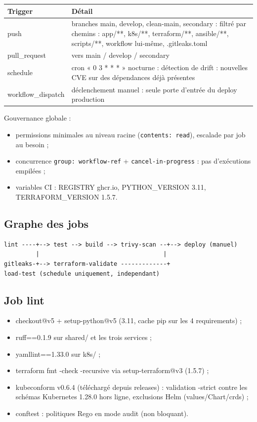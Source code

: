 \documentclass[12pt,a4paper,twoside,openright]{report}
\begin{document}
\begin{center}\label{tab:ch-github-actions-declenchements-et-gouvernance}\end{center}
\begin{longtable}{@{}p{3.4cm}p{10.8cm}@{}}
\toprule
\textbf{Trigger} & \textbf{Détail} \\
\midrule
\endhead
push & branches main, develop, clean-main, secondary : filtré par chemins : app/**, k8s/**, terraform/**, ansible/**, scripts/**, workflow lui-même, .gitleaks.toml \\
pull\_request & vers main / develop / secondary \\
schedule & cron « 0 3 * * * » nocturne : détection de drift : nouvelles CVE sur des dépendances déjà présentes \\
workflow\_dispatch & déclenchement manuel : seule porte d'entrée du deploy production \\
\bottomrule
\end{longtable}

Gouvernance globale :
\begin{itemize}[itemsep=1pt]
  \item permissions minimales au niveau racine (\texttt{contents: read}), escalade par job au besoin ;
  \item concurrence \texttt{group: workflow-ref} + \texttt{cancel-in-progress} : pas d'exécutions empilées ;
  \item variables CI : REGISTRY ghcr.io, PYTHON\_VERSION 3.11, TERRAFORM\_VERSION 1.5.7.
\end{itemize}

\subsection{Graphe des jobs}
\begin{lstlisting}[caption={Ordre et dépendances des jobs}]
lint ----+--> test --> build --> trivy-scan --+--> deploy (manuel)
         |                                   |
gitleaks-+--> terraform-validate -------------+
load-test (schedule uniquement, independant)
\end{lstlisting}

\subsection{Job lint}
\begin{itemize}[itemsep=1pt]
  \item checkout@v5 + setup-python@v5 (3.11, cache pip sur les 4 requirements) ;
  \item ruff==0.1.9 sur shared/ et les trois services ;
  \item yamllint==1.33.0 sur k8s/ ;
  \item terraform fmt -check -recursive via setup-terraform@v3 (1.5.7) ;
  \item kubeconform v0.6.4 (téléchargé depuis releases) : validation -strict contre les schémas Kubernetes 1.28.0 hors ligne, exclusions Helm (values/Chart/crds) ;
  \item conftest : politiques Rego en mode audit (non bloquant).
\end{itemize}
\end{document}
